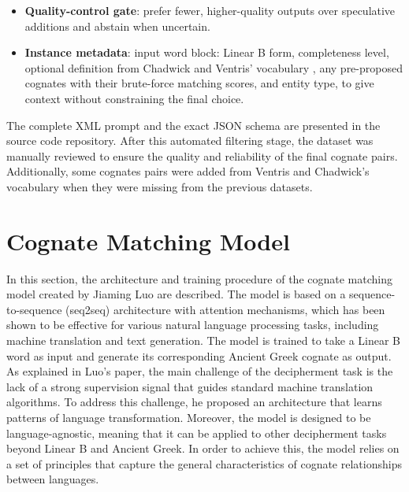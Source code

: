 \begin{itemize}[leftmargin=2em]
  \item \textbf{Quality-control gate}: prefer fewer, higher-quality outputs over speculative additions and abstain when uncertain.
  \item \textbf{Instance metadata}: input word block: Linear B form, completeness level, optional definition from Chadwick and Ventris' vocabulary \cite{chadwick-notes}, any pre-proposed cognates with their brute-force matching scores, and entity type, to give context without constraining the final choice.
\end{itemize}

The complete XML prompt and the exact JSON schema are presented in the source code repository.
After this automated filtering stage, the dataset was manually reviewed to ensure the quality and reliability of the final cognate pairs.
Additionally, some cognates pairs were added from Ventris and Chadwick's vocabulary \cite{chadwick-notes} when they were missing from the previous datasets.

\section{Cognate Matching Model}
In this section, the architecture and training procedure of the cognate matching model created by Jiaming Luo \cite{luo} are described.
The model is based on a sequence-to-sequence (seq2seq) architecture with attention mechanisms, which has been shown to be effective for various natural language processing tasks, including machine translation and text generation.
The model is trained to take a Linear B word as input and generate its corresponding Ancient Greek cognate as output.
As explained in Luo's paper, the main challenge of the decipherment task is the lack of a strong supervision signal that guides standard machine translation algorithms.
To address this challenge, he proposed an architecture that learns patterns of language transformation.
Moreover, the model is designed to be language-agnostic, meaning that it can be applied to other decipherment tasks beyond Linear B and Ancient Greek.
In order to achieve this, the model relies on a set of principles that capture the general characteristics of cognate relationships between languages.

